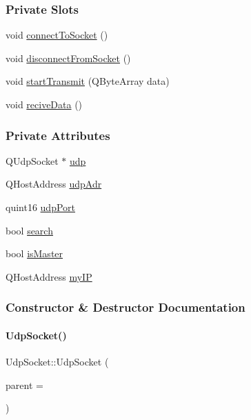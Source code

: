 \subsubsection*{Private Slots}
\begin{DoxyCompactItemize}
\item 
void \mbox{\hyperlink{classUdpSocket_a4c16ef2e336d0504adb9118455fa7154}{connect\+To\+Socket}} ()
\item 
void \mbox{\hyperlink{classUdpSocket_a35cee44b0c57e6e5ec24c692d2ef9fb8}{disconnect\+From\+Socket}} ()
\item 
void \mbox{\hyperlink{classUdpSocket_a5c7396705869aab2fd14770582aff025}{start\+Transmit}} (Q\+Byte\+Array data)
\item 
void \mbox{\hyperlink{classUdpSocket_aa6b5948ab613404d74717eb7d9526dfb}{recive\+Data}} ()
\end{DoxyCompactItemize}
\subsubsection*{Private Attributes}
\begin{DoxyCompactItemize}
\item 
Q\+Udp\+Socket $\ast$ \mbox{\hyperlink{classUdpSocket_ac8d766e026e7685c741f631acc64e906}{udp}}
\item 
Q\+Host\+Address \mbox{\hyperlink{classUdpSocket_abb938c7331685fd351d93be1cb0d8524}{udp\+Adr}}
\item 
quint16 \mbox{\hyperlink{classUdpSocket_a13ad80532191677ae811e88181bed986}{udp\+Port}}
\item 
bool \mbox{\hyperlink{classUdpSocket_aeffff5f69078361d1f7c088827cf651d}{search}}
\item 
bool \mbox{\hyperlink{classUdpSocket_aa5132ded0322787b898fa346a42f7dce}{is\+Master}}
\item 
Q\+Host\+Address \mbox{\hyperlink{classUdpSocket_a784b0938e5af88875f8de414d58e536a}{my\+IP}}
\end{DoxyCompactItemize}


\subsubsection{Constructor \& Destructor Documentation}
\mbox{\label{classUdpSocket_a25a2f670352d9f600143c370beafd8f6}} 
\paragraph{\texorpdfstring{Udp\+Socket()}{UdpSocket()}}
{\footnotesize\ttfamily Udp\+Socket\+::\+Udp\+Socket (\begin{DoxyParamCaption}\item[{Q\+Widget $\ast$}]{parent = {} }\end{DoxyParamCaption})\hspace{0.3cm}{\ttfamily [explicit]}}



